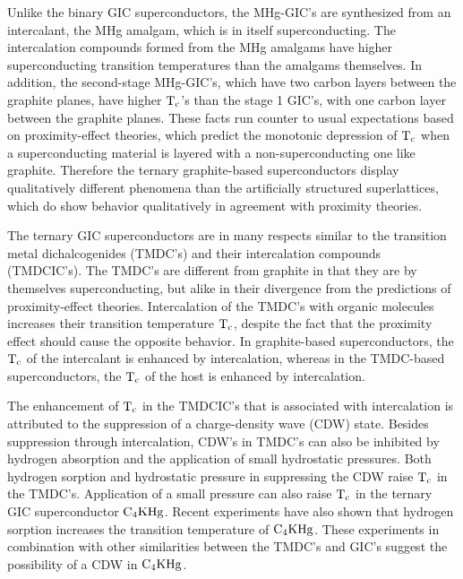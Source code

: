         Unlike    the   binary GIC   superconductors,   the MHg-GIC's   are
synthesized from an  intercalant,  the MHg  amalgam,   which is  in  itself
superconducting.  The intercalation compounds  formed from the MHg amalgams
have higher  superconducting    transition temperatures  than  the amalgams
themselves.  In addition, the second-stage MHg-GIC's, which have two carbon
layers between the graphite planes, have higher $\rm  T_c$'s than the stage
1 GIC's, with  one carbon layer between  the graphite planes.   These facts
run counter     to    usual   expectations  based     on   proximity-effect
theories,\cite{werthamer63,cooper61} which predict the monotonic depression
of  $\rm    T_c$ when  a  superconducting material     is  layered  with  a
non-superconducting  one   like     graphite.   Therefore    the    ternary
graphite-based  superconductors display  qualitatively different phenomena
than the artificially structured superlattices, which do show behavior
qualitatively in agreement with proximity theories.\cite{ruggiero85}

        The ternary GIC superconductors are in many respects similar to the
transition metal di\-chal\-cog\-enides (TMDC's) and their in\-ter\-ca\-la\-tion com\-pounds
(TMDCIC's).   The  TMDC's are  different from graphite  in that they are by
themselves   superconducting,  but  alike  in   their divergence from   the
predictions of proximity-effect theories.  Intercalation of the TMDC's with
organic   molecules    increases     their  transition    temperature  $\rm
T_c$,\cite{gamble70,prober80} despite  the  fact that the proximity  effect
should cause the opposite behavior.  In graphite-based superconductors, the
$\rm T_c$ of  the intercalant is enhanced  by intercalation, whereas in the
TMDC-based superconductors,  the $\rm T_c$   of the host  is   enhanced  by
intercalation.

        The enhancement of  $\rm T_c$ in  the TMDCIC's that  is  associated
with intercalation  is attributed to the  suppression  of  a charge-density
wave (CDW) state.\cite{murphy75} Besides suppression through intercalation,
CDW's in TMDC's can also be inhibited by hydrogen absorption\cite{murphy75}
and the  application of  small hydrostatic  pressures.\cite{monceau77} Both
hydrogen sorption  and  hydrostatic pressure in   suppressing the CDW raise
$\rm T_c$ in  the TMDC's.  Application  of a small pressure can  also raise
$\rm T_c$  in  the ternary GIC  superconductor $\rm C_4KHg$.\cite{delong83}
Recent experiments have  also shown  that  hydrogen sorption increases  the
transition temperature  of $\rm C_4KHg$.\cite{H242}   These experiments  in
combination with other  similarities  between the TMDC's and  GIC's suggest
the possibility of a CDW in $\rm C_4KHg$.\cite{delong83}
                
